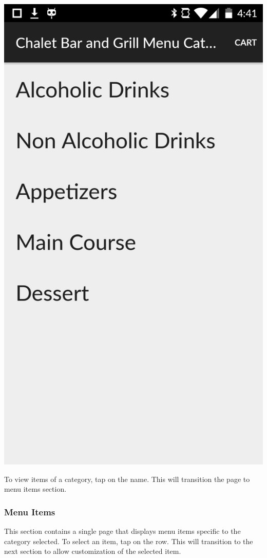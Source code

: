 \documentclass[12pt, titlepage]{article}
\begin{document}
\begin{center}\includegraphics[scale=0.15]{category.png}\end{center}

\noindent To view items of a category, tap on the name. This will transition the page to menu items section.

\subsubsection{Menu Items}
This section contains a single page that displays menu items specific to the category selected. To select an item, tap on the row. This will transition to the next section to allow customization of the selected item. 
\end{document}
